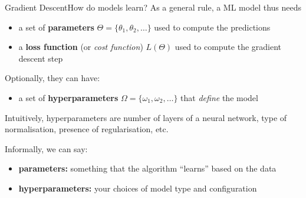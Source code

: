 \begin{frame}{Gradient Descent}{How do models learn?}
    As a general rule, a ML model thus needs
    \begin{itemize}
        \item a set of \textbf{parameters} $\Theta = \{ \theta_1, \theta_2, \dots \}$ used to compute the predictions
        \item a \textbf{loss function} (or \emph{cost function}) $L(\Theta)$ used to compute the gradient descent step
    \end{itemize}

    \vfill \pause

    Optionally, they can have:
    \begin{itemize}
        \item a set of \textbf{hyperparameters} $\Omega = \{ \omega_1, \omega_2, \dots \}$ that \emph{define} the model
    \end{itemize}

    Intuitively, hyperparameters are number of layers of a neural network, type of normalisation, presence of regularisation, etc.

    \vfill \pause

    Informally, we can say:
    \begin{itemize}
        \item \textbf{parameters:} something that the algorithm \enquote{learns} based on the data
        \item \textbf{hyperparameters:} your choices of model type and configuration
    \end{itemize}
\end{frame}

